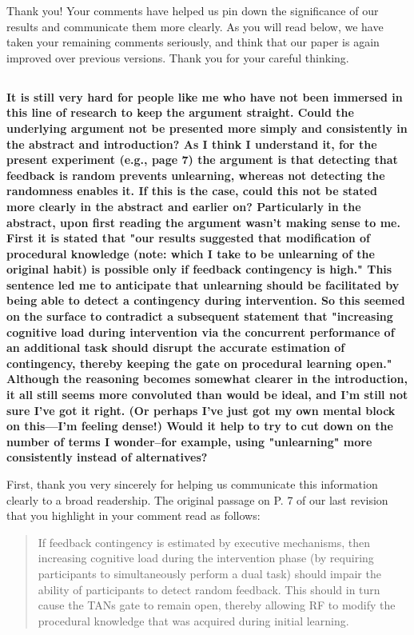 \documentclass[10pt,a4paper]{article}
\begin{document}
Thank you! Your comments have helped us pin down the significance of our results
and communicate them more clearly. As you will read below, we have taken your
remaining comments seriously, and think that our paper is again improved over
previous versions. Thank you for your careful thinking.

\subsection{} \textbf{It is still very hard for people like me who have not been
  immersed in this line of research to keep the argument straight. Could the
  underlying argument not be presented more simply and consistently in the
  abstract and introduction? As I think I understand it, for the present
  experiment (e.g., page 7) the argument is that detecting that feedback is random
  prevents unlearning, whereas not detecting the randomness enables it. If this is
  the case, could this not be stated more clearly in the abstract and earlier on?
  Particularly in the abstract, upon first reading the argument wasn't making
  sense to me. First it is stated that "our results suggested that modification of
  procedural knowledge (note: which I take to be unlearning of the original habit)
  is possible only if feedback contingency is high." This sentence led me to
  anticipate that unlearning should be facilitated by being able to detect a
  contingency during intervention. So this seemed on the surface to contradict a
  subsequent statement that "increasing cognitive load during intervention via the
  concurrent performance of an additional task should disrupt the accurate
  estimation of contingency, thereby keeping the gate on procedural learning
  open." Although the reasoning becomes somewhat clearer in the introduction, it
  all still seems more convoluted than would be ideal, and I'm still not sure I've
  got it right. (Or perhaps I've just got my own mental block on this—I'm feeling
  dense!) Would it help to try to cut down on the number of terms I wonder--for
  example, using "unlearning" more consistently instead of alternatives?}

First, thank you very sincerely for helping us communicate this information
clearly to a broad readership. The original passage on P. 7 of our last revision
that you highlight in your comment read as follows:

\begin{quote}
  If feedback contingency is estimated by executive mechanisms, then increasing
  cognitive load during the intervention phase (by requiring participants to
  simultaneously perform a dual task) should impair the ability of participants to
  detect random feedback. This should in turn cause the TANs gate to remain open,
  thereby allowing RF to modify the procedural knowledge that was acquired during
  initial learning.
\end{quote}
\end{document}
